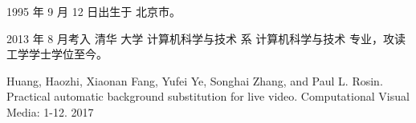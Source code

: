\begin{resume}


  1995 年 9 月 12 日出生于 北京市。

  2013 年 8 月考入 清华 大学 计算机科学与技术 系 计算机科学与技术 专业，攻读工学学士学位至今。



 
  \begin{publications}
    \item Huang, Haozhi, Xiaonan Fang, Yufei Ye, Songhai Zhang, and Paul L. Rosin. Practical automatic background substitution for live video. Computational Visual Media: 1-12. 2017
  \end{publications}

  
\end{resume}
